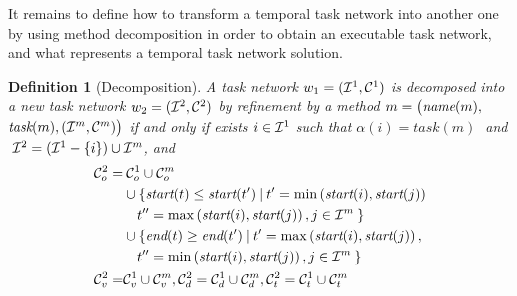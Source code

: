 \documentclass[letterpaper]{article} %
\newtheorem{definition}{Definition}
\newcommand{\name}{\text{\it name}}
\newcommand{\tstart}{\text{\it start}}
\newcommand{\tend}{\text{\it end}}
\newcommand{\task}{\text{\it task}}
\newcommand{\tn}{\text{\it tn}}
\begin{document}
  It remains to define how to transform a temporal task network into another one by using method decomposition in order to obtain an executable task network,
  and what represents a temporal task network solution.
%


\begin{definition}[Decomposition]\label{def:decomp}
  A task network $w_1= ({\cal{I}}^1, {\cal{C}}^{1})$ is decomposed into a new task network
  $w_2= ({\cal{I}}^2, {\cal{C}}^{2})$ by refinement by a method $m = \bigl(\name(m),$ $\task(m), ({\cal{I}}^m, {\cal{C}}^{m})\bigr)$ 
  if and only if exists \mbox{$i \in {\cal{I}}^1$} such that $\alpha(i) = task(m)\;$ and
  $\;{\cal{I}}^2 = ({\cal{I}}^1 - \{i\}) \cup {\cal{I}}^m$, and 
\begin{equation*} \label{eq1} 
\begin{aligned}
{\cal{C}}^{2}_{o} = & \:{\cal{C}}^{1}_{o} \cup {\cal{C}}^{m}_{o} \\
& \cup \{ \tstart(t) \leq \tstart(t') \: | \: t'= \min\left(\tstart(i),\tstart(j)\right)\\
&\quad t''= \max\left(\tstart(i),\tstart(j)\right), j \in {\cal{I}}^m \:  \}  \\
& \cup \{ \tend(t) \geq \tend(t') \: | \: t'= \max\left(\tstart(i),\tstart(j)\right),\\
& \quad t''= \min\left(\tstart(i),\tstart(j)\right), j \in {\cal{I}}^m \:  \}\\
{\cal{C}}^{2}_{v}  = & {\cal{C}}^{1}_{v} \cup {\cal{C}}^{m}_{v}, 
{\cal{C}}^{2}_{d}  =  {\cal{C}}^{1}_{d} \cup {\cal{C}}^{m}_{d}, 
{\cal{C}}^{2}_{t}  =  {\cal{C}}^{1}_{t} \cup {\cal{C}}^{m}_{t}
\end{aligned}
\end{equation*}
\end{definition}
\end{document}
